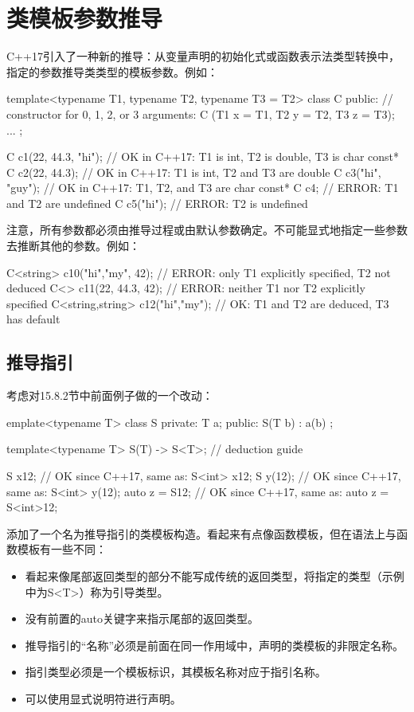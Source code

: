 \section{类模板参数推导}

C++17引入了一种新的推导：从变量声明的初始化式或函数表示法类型转换中，指定的参数推导类类型的模板参数。例如：

\begin{cpp}
template<typename T1, typename T2, typename T3 = T2>
class C
{
	public:
	// constructor for 0, 1, 2, or 3 arguments:
	C (T1 x = T1{}, T2 y = T2{}, T3 z = T3{});
	...
};

C c1(22, 44.3, "hi"); // OK in C++17: T1 is int, T2 is double, T3 is char const*
C c2(22, 44.3); // OK in C++17: T1 is int, T2 and T3 are double
C c3("hi", "guy"); // OK in C++17: T1, T2, and T3 are char const*
C c4; // ERROR: T1 and T2 are undefined
C c5("hi"); // ERROR: T2 is undefined
\end{cpp}

注意，所有参数都必须由推导过程或由默认参数确定。不可能显式地指定一些参数去推断其他的参数。例如：

\begin{cpp}
C<string> c10("hi","my", 42); // ERROR: only T1 explicitly specified, T2 not deduced
C<> c11(22, 44.3, 42); // ERROR: neither T1 nor T2 explicitly specified
C<string,string> c12("hi","my"); // OK: T1 and T2 are deduced, T3 has default
\end{cpp}

\subsection{推导指引}

考虑对15.8.2节中前面例子做的一个改动：

\begin{cpp}
emplate<typename T>
class S {
	private:
	T a;
	public:
	S(T b) : a(b) {
	}
};

template<typename T> S(T) -> S<T>; // deduction guide

S x{12}; // OK since C++17, same as: S<int> x{12};
S y(12); // OK since C++17, same as: S<int> y(12);
auto z = S{12}; // OK since C++17, same as: auto z = S<int>{12};
\end{cpp}

添加了一个名为推导指引的类模板构造。看起来有点像函数模板，但在语法上与函数模板有一些不同：

\begin{itemize}
\item 
看起来像尾部返回类型的部分不能写成传统的返回类型，将指定的类型（示例中为S<T>）称为引导类型。

\item 
没有前置的auto关键字来指示尾部的返回类型。

\item 
推导指引的“名称”必须是前面在同一作用域中，声明的类模板的非限定名称。

\item 
指引类型必须是一个模板标识，其模板名称对应于指引名称。

\item 
可以使用显式说明符进行声明。
\end{itemize}	

